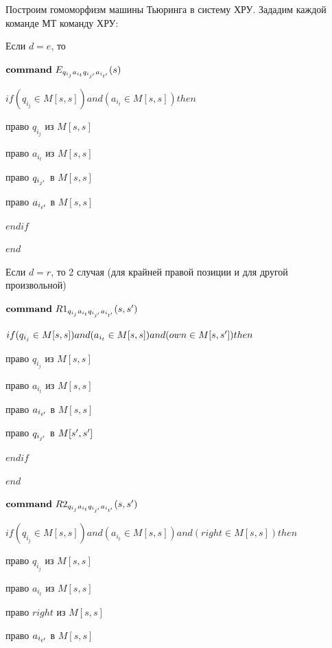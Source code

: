 \begin{proofs}
\begin{dokvo}
		Построим гомоморфизм машины Тьюринга в систему ХРУ. Зададим каждой команде МТ команду ХРУ:

		Если $d = e$, то

		$\mathbf{command} \  E_{q_{i_{j}}a_{i_{t}}q_{i_{j^{\prime}}}a_{i_{t^{\prime}}}}(s)$

		$if (q_{i_{j}} \in M[s,s]) and (a_{i_{t}} \in M[s,s]) then $

		 право $q_{i_{j}}$ из $M[s,s]$

		 право $a_{i_{t}}$ из $M[s,s]$

		 право $q_{i_{j^{\prime}}}$ в $M[s,s]$

		 право $a_{i_{t^{\prime}}}$ в $M[s,s]$

		$endif$

		$end$

		Если $d = r$, то 2 случая (для крайней правой позиции и для другой произвольной)
		\begin{multicols}{2}
			\begin{itemize*}
				\item 	$\mathbf{command} \  R1_{q_{i_{j}}a_{i_{t}}q_{i_{j^{\prime}}}a_{i_{t^{\prime}}}}(s, s^{\prime})$

					$if (q_{i_{j}} \in M[s,s]) and (a_{i_{t}} \in M[s,s]) and (own \in M[s,s^{\prime}]) then $

					 право $q_{i_{j}}$ из $M[s,s]$

					 право $a_{i_{t}}$ из $M[s,s]$

					 право $a_{i_{t^{\prime}}}$ в $M[s,s]$

					 право $q_{i_{j^{\prime}}}$ в $M[s^{\prime},s^{\prime}]$

					$endif$

					$end$

					\item $\mathbf{command} \  R2_{q_{i_{j}}a_{i_{t}}q_{i_{j^{\prime}}}a_{i_{t^{\prime}}}}(s, s^{\prime})$

					$if (q_{i_{j}} \in M[s,s]) and (a_{i_{t}} \in M[s,s])and (right \in M[s,s]) then $

					 право $q_{i_{j}}$ из $M[s,s]$

					 право $a_{i_{t}}$ из $M[s,s]$

					 право $right$ из $M[s,s]$

					 право $a_{i_{t^{\prime}}}$ в $M[s,s]$


\end{itemize*}
\end{multicols}
\end{dokvo}
\end{proofs}
